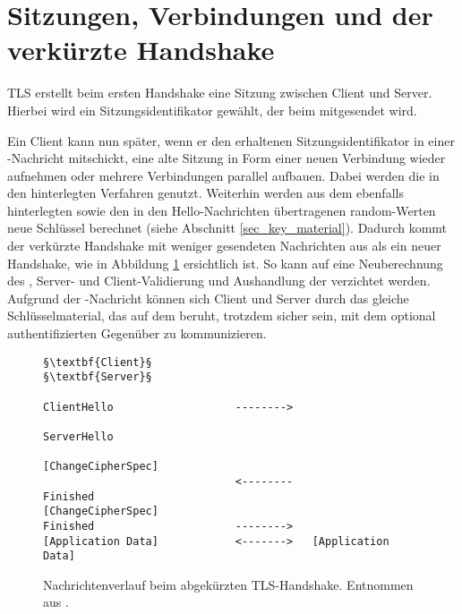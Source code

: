 \section{Sitzungen, Verbindungen und der verkürzte Handshake}
\label{sec_session_connection}

TLS erstellt beim ersten Handshake eine Sitzung zwischen Client und Server. Hierbei wird ein Sitzungsidentifikator gewählt, der beim \serverhello{} mitgesendet wird. 

Ein Client kann nun später, wenn er den erhaltenen Sitzungsidentifikator in einer \clienthello{}-Nachricht mitschickt, eine alte Sitzung in Form einer neuen Verbindung wieder aufnehmen oder mehrere Verbindungen parallel aufbauen. Dabei werden die in den  hinterlegten Verfahren genutzt. Weiterhin werden aus dem ebenfalls hinterlegten \mastersecret{} sowie den in den Hello-Nachrichten übertragenen random-Werten neue Schlüssel berechnet (siehe Abschnitt \ref{sec_key_material}). Dadurch kommt der verkürzte Handshake mit weniger gesendeten Nachrichten aus als ein neuer Handshake, wie in Abbildung \ref{fig_abbreviated_handshake} ersichtlich ist. So kann auf eine Neuberechnung des \mastersecret{}, Server- und Client-Validierung und Aushandlung der \ciphersuite{} verzichtet werden. Aufgrund der \finished{}-Nachricht können sich Client und Server durch das gleiche Schlüsselmaterial, das auf dem \mastersecret{} beruht, trotzdem sicher sein, mit dem optional authentifizierten Gegenüber zu kommunizieren.

\lstset{
	style=default,
	frame=single
}
\begin{figure}[H]
	\centering
	\begin{lstlisting}
§\textbf{Client}§                                                §\textbf{Server}§

ClientHello                   -------->
                                                 ServerHello
                                          [ChangeCipherSpec]
                              <--------             Finished
[ChangeCipherSpec]
Finished                      -------->
[Application Data]            <------->   [Application Data]
	\end{lstlisting}
	\caption{Nachrichtenverlauf beim abgekürzten TLS-Handshake. Entnommen aus \cite{tls12}.}
	\label{fig_abbreviated_handshake}
\end{figure}
\lstset{style=tls}

\section{\changecipherspecprotocol{}}
\label{sec_change_cipher_spec}

